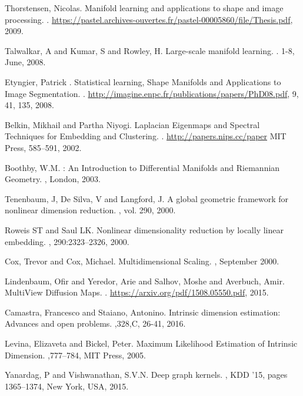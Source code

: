 \begin{thebibliography}{99}
\setlength{\parskip}{1em}

 Thorstensen, Nicolas. 
\newblock Manifold learning and applications to shape and image processing.
.
\newblock \url {https://pastel.archives-ouvertes.fr/pastel-00005860/file/Thesis.pdf}, 2009.


 Talwalkar, A and Kumar, S and Rowley, H. 
\newblock Large-scale manifold learning.
. 1-8, June, 2008.


 Etyngier, Patrick . 
\newblock Statistical learning, Shape Manifolds and Applications to Image Segmentation.
.
\newblock \url {http://imagine.enpc.fr/publications/papers/PhD08.pdf}, 9, 41, 135, 2008.

 Belkin, Mikhail and Partha Niyogi. 
\newblock Laplacian Eigenmaps and Spectral Techniques for Embedding and Clustering.
.
\newblock \url {http://papers.nips.cc/paper} MIT Press, 585--591, 2002.

 Boothby, W.M.
\newblock: An Introduction to Differential Manifolds and Riemannian Geometry. 
, London, 2003.


 Tenenbaum, J,  De Silva, V and Langford, J. 
\newblock A global geometric framework for nonlinear dimension reduction.
, vol. 290, 2000.

 Roweis ST and Saul LK.
\newblock  Nonlinear dimensionality reduction by locally linear embedding.
, 290:2323–2326, 2000.

 Cox, Trevor and Cox, Michael.
\newblock Multidimensional Scaling.
, September 2000.

 Lindenbaum, Ofir and Yeredor, Arie and Salhov, Moshe and Averbuch, Amir.
\newblock MultiView Diffusion Maps.
.
\newblock \url {https://arxiv.org/pdf/1508.05550.pdf}, 2015.

 Camastra, Francesco and Staiano, Antonino.
\newblock  Intrinsic dimension estimation: Advances and open problems.
,328,C, 26-41, 2016.

 Levina, Elizaveta  and Bickel, Peter.
\newblock  Maximum Likelihood Estimation of Intrinsic Dimension.
,777--784, MIT Press, 2005.





 Yanardag, P and Vishwanathan, S.V.N. 
\newblock Deep graph kernels. 
, KDD ’15, pages 1365–1374, New York, USA, 2015.



\end{thebibliography}

